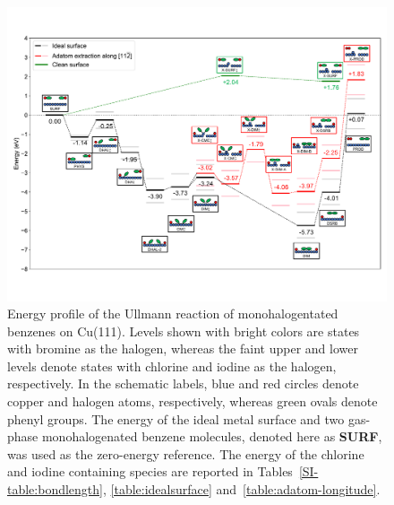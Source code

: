 \documentclass[aps,prb,amsmath,amssymb,11pt]{revtex4-1}
\begin{document}
\begin{figure}[bt]
\centering
\includegraphics[width=1.\textwidth]{Fig/main-profile.pdf}
\caption{Energy profile of the Ullmann reaction of monohalogentated benzenes on Cu(111). Levels shown with bright colors are states with bromine as the halogen, whereas the faint upper and lower levels denote states with chlorine and iodine as the halogen, respectively. In the schematic labels, blue and red circles denote copper and halogen atoms, respectively, whereas green ovals denote phenyl groups. The energy of the ideal metal surface and two gas-phase monohalogenated benzene molecules, denoted here as \textbf{SURF}, was used as the zero-energy reference. The energy of the chlorine and iodine containing species are reported in Tables~\ref{SI-table:bondlength}, \ref{table:idealsurface} and~\ref{table:adatom-longitude}.
}
\label{fig:completeenergy}
\end{figure}
\end{document}
